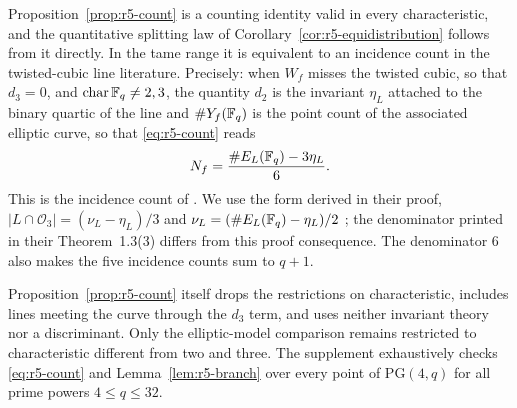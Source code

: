 Proposition~\ref{prop:r5-count} is a counting identity valid in every
characteristic, and the quantitative splitting law of
Corollary~\ref{cor:r5-equidistribution} follows from it directly.  In
the tame range it is equivalent to an incidence count in the
twisted-cubic line literature.  Precisely: when $W_f$ misses the twisted
cubic, so that $d_3=0$, and $\operatorname{char}\mathbb F_q\neq2,3$, the
quantity $d_2$ is the invariant $\eta_L$ attached to the binary quartic
of the line and $\#Y_f(\mathbb F_q)$ is the point count of the associated
elliptic curve, so that \eqref{eq:r5-count} reads
\[
       N_f=\frac{\#E_L(\mathbb F_q)-3\eta_L}{6}.
\]
This is the incidence count of \cite{KaipaPradhan2025}.  We use the form
derived in their proof,
$|L\cap\mathcal O_3|=(\nu_L-\eta_L)/3$ and
$\nu_L=(\#E_L(\mathbb F_q)-\eta_L)/2$
\cite[Prop.~4.5(3) and Thm.~5.1]{KaipaPradhan2025}; the denominator
printed in their Theorem~1.3(3) differs from this proof consequence.
The denominator $6$ also makes the five incidence counts sum to $q+1$.

Proposition~\ref{prop:r5-count} itself drops the restrictions on
characteristic, includes lines meeting the curve through the $d_3$ term, and
uses neither invariant theory nor a discriminant.  Only the elliptic-model
comparison remains restricted to characteristic different from two and three.
The supplement exhaustively checks \eqref{eq:r5-count} and
Lemma~\ref{lem:r5-branch} over every point of $\mathrm{PG}(4,q)$ for all prime
powers $4\leq q\leq32$.


